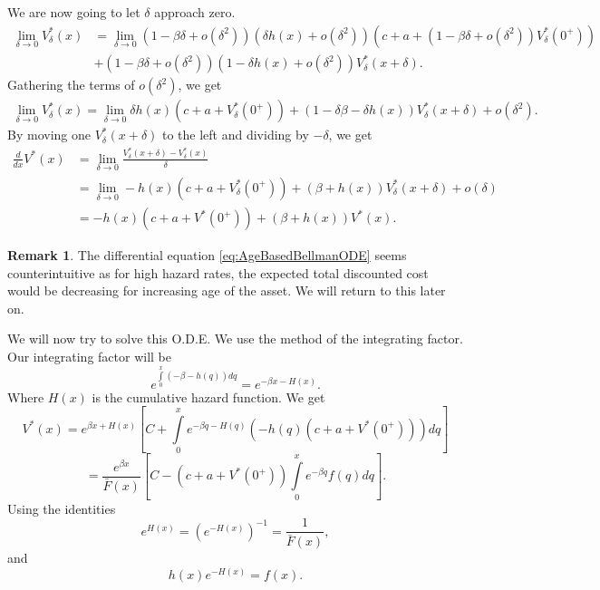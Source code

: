 \documentclass[a4paper]{thesis}
\theoremstyle{definition}
\newtheorem{remark}{Remark}[chapter]
\begin{document}
We are now going to let $\delta$ approach zero.
\begin{equation}
\begin{split}
\lim\limits_{\delta\rightarrow 0} V_\delta^*(x) &=
\lim\limits_{\delta\rightarrow 0}(1-\beta\delta+o(\delta^2)) (\delta h(x)+o(\delta^2))(c+a+(1-\beta\delta+o(\delta^2)) V^*_\delta(0^+))\\
&+(1-\beta\delta+o(\delta^2)) (1-\delta h(x)+o(\delta^2))V_\delta^*(x+\delta).
\end{split}
\end{equation}
Gathering the terms of $o(\delta^2)$, we get
\begin{equation}\label{eq:gatheredDelta}
\begin{split}
\lim\limits_{\delta\rightarrow 0} V_\delta^*(x) =
\lim\limits_{\delta\rightarrow 0}\delta h(x)(c+a+ V_\delta^*(0^+))+(1-\delta\beta-\delta h(x)) V_\delta^*(x+\delta)+o(\delta^2).
\end{split}
\end{equation}
By moving one $V_\delta^*(x+\delta)$ to the left and dividing by $-\delta$, we get
\begin{equation}\label{eq:AgeBasedBellmanODE}
\begin{split}
\frac{d}{dx}V^*(x)&=\lim\limits_{\delta\rightarrow 0} \frac{V_\delta^*(x+\delta)-V_\delta^*(x)}{\delta} \\
&=\lim\limits_{\delta\rightarrow 0} -h(x)(c+a+ V_\delta^*(0^+))+(\beta+ h(x)) V_\delta^*(x+\delta)+o(\delta)\\
&=-h(x)(c+a+ V^*(0^+))+(\beta+ h(x)) V^*(x).
\end{split}
\end{equation}
\begin{remark}\label{remark:AgeBasedWeirdODE}
	The differential equation \eqref{eq:AgeBasedBellmanODE} seems counterintuitive as for high hazard rates, the expected total discounted cost would be decreasing for increasing age of the asset.
	We will return to this later on.
\end{remark}
We will now try to solve this O.D.E.
We use the method of the integrating factor.
Our integrating factor will be
$$
e^{\int\limits_0^x (-\beta - h(q))dq}=e^{-\beta x -H(x)}.
$$
Where $H(x)$ is the cumulative hazard function.
We get
$$
V^*(x)=e^{\beta x +H(x)} [C + \int\limits_0^x e^{-\beta q -H(q)}(-h(q)(c+a+V^*(0^+)))dq]
$$
$$
=\frac{e^{\beta x}}{\bar F(x)} [C - (c+a+V^*(0^+))\int\limits_0^x e^{-\beta q}f(q)dq].
$$
Using the identities 
\[e^{H(x)}=(e^{-H(x)})^{-1}=\frac{1}{\bar F(x)},\]
and
\[h(x)e^{-H(x)}=f(x).\]
\end{document}
